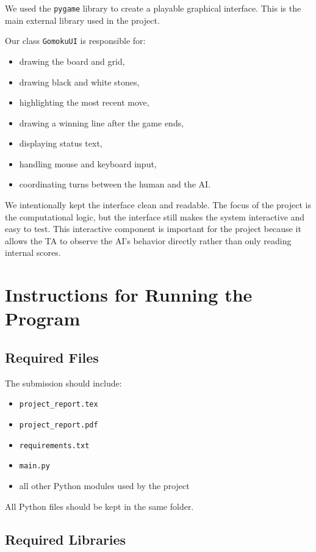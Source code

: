 \documentclass[11pt]{article}
\begin{document}
We used the \texttt{pygame} library to create a playable graphical interface.\cite{pygame_docs} This is the main external library used in the project.

Our class \texttt{GomokuUI} is responsible for:
\begin{itemize}
    \item drawing the board and grid,\cite{pygame_display}
    \item drawing black and white stones,
    \item highlighting the most recent move,
    \item drawing a winning line after the game ends,
    \item displaying status text,\cite{pygame_font}
    \item handling mouse and keyboard input,
    \item coordinating turns between the human and the AI.
\end{itemize}

We intentionally kept the interface clean and readable. The focus of the project is the computational logic, but the interface still makes the system interactive and easy to test. This interactive component is important for the project because it allows the TA to observe the AI's behavior directly rather than only reading internal scores.

\section*{Instructions for Running the Program}

\subsection*{Required Files}

The submission should include:
\begin{itemize}
    \item \texttt{project\_report.tex}
    \item \texttt{project\_report.pdf}
    \item \texttt{requirements.txt}
    \item \texttt{main.py}
    \item all other Python modules used by the project
\end{itemize}

All Python files should be kept in the same folder.

\subsection*{Required Libraries}
\end{document}
